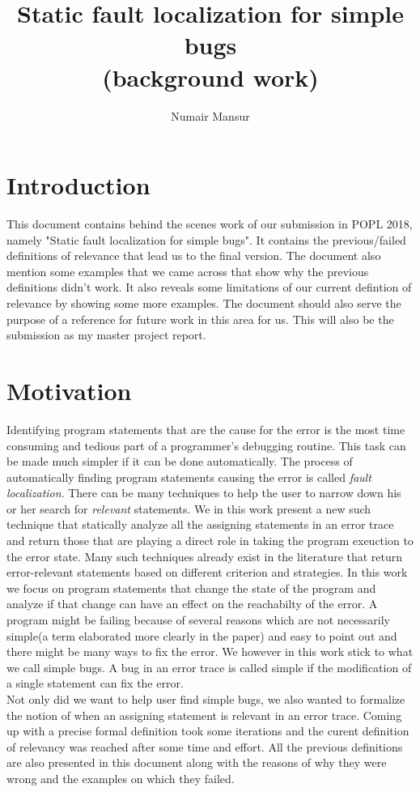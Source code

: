 \documentclass{article}
\title{Static fault localization for simple bugs \\ \normalsize{(background work)}}
\author{Numair Mansur}
\affil{University of Freiburg, Germany}
\date{\vspace{-5ex}}
\begin{document}
\maketitle
\section{Introduction}
This document contains behind the scenes work of our submission in POPL 2018, namely "Static fault localization for simple bugs". It contains the previous/failed definitions of relevance that lead us to the final version. The document also mention some examples that we came across that show why the previous definitions didn't work. It also reveals some limitations of our current defintion of relevance by showing some more examples. The document should also serve the purpose of a reference for future work in this area for us. This will also be the submission as my master project report.
\section{Motivation}
Identifying program statements that are the cause for the error is the most time consuming and tedious part of a programmer's debugging routine. This task can be made much simpler if it can be done automatically. The process of automatically finding program statements causing the error is called \textit{fault localization}. There can be many techniques to help the user to narrow down his or her search for \textit{relevant} statements. We in this work present a new such technique that statically analyze all the assigning statements in an error trace and return those that are playing a direct role in taking the program exeuction to the error state. Many such techniques already exist in the literature that return error-relevant statements based on different criterion and strategies. In this work we focus on program statements that change the state of the program and analyze if that change can have an effect on the reachabilty of the error. A program might be failing because of several reasons which are not necessarily simple(a term elaborated more clearly in the paper) and easy to point out and there might be many ways to fix the error. We however in this work stick to what we call simple bugs. A bug in an error trace is called simple if the modification of a single statement can fix the error.\\
Not only did we want to help user find simple bugs, we also wanted to formalize the notion of when an assigning statement is relevant in an error trace.
Coming up with a precise formal definition took some iterations and the curent definition of relevancy was reached after some time and effort. All the previous definitions are also presented in this document along with the reasons of why they were wrong and the examples on which they failed.
\end{document}
